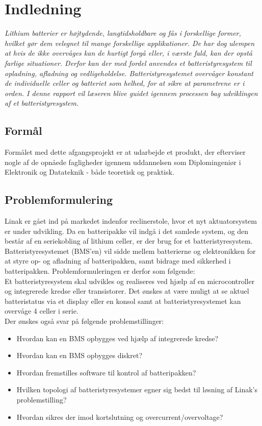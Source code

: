 \chapter{Indledning}

\emph{Lithium batterier er højtydende, langtidsholdbare og fås i forskellige former, hvilket gør dem velegnet til mange forskellige applikationer. De har dog ulempen at hvis de ikke overvåges kan de hurtigt forgå eller, i værste fald, kan der opstå farlige situationer. Derfor kan der med fordel anvendes et batteristyresystem til opladning, afladning og vedligeholdelse. Batteristyresystemet overvåger konstant de individuelle celler og batteriet som helhed, for at sikre at parametrene er i orden. I denne rapport vil læseren blive guidet igennem processen bag udviklingen af et batteristyresystem.}

\section{Formål}
Formålet med dette afgangsprojekt er at udarbejde et produkt, der efterviser nogle af de opnåede fagligheder igennem uddannelsen som Diplomingeniør i Elektronik og Datateknik - både teoretisk og praktisk.

\section{Problemformulering}
Linak er gået ind på markedet indenfor reclinerstole, hvor et nyt aktuatorsystem er under udvikling. Da en batteripakke vil indgå i det samlede system, og den består af en seriekobling af lithium celler, er der brug for et batteristyresystem. Batteristyresystemet (BMS’en) vil sidde mellem batterierne og elektronikken for at styre op- og afladning af batteripakken, samt bidrage med sikkerhed i batteripakken. Problemformuleringen er derfor som følgende:\\

Et batteristyresystem skal udvikles og realiseres ved hjælp af en microcontroller og integrerede kredse eller transistorer. Det ønskes at være muligt at se aktuel batteristatus via et display eller en konsol samt at batteristyresystemet kan overvåge 4 celler i serie. \\

Der ønskes også svar på følgende problemstillinger: 
\begin{itemize}[noitemsep]
	\item Hvordan kan en BMS opbygges ved hjælp af integrerede kredse?
	\item Hvordan kan en BMS opbygges diskret? 
	\item Hvordan fremstilles software til kontrol af batteripakken?
	\item Hvilken topologi af batteristyresystemer egner sig bedst til løsning af Linak's problemstilling? 
	\item Hvordan sikres der imod kortslutning og overcurrent/overvoltage? 
\end{itemize}

